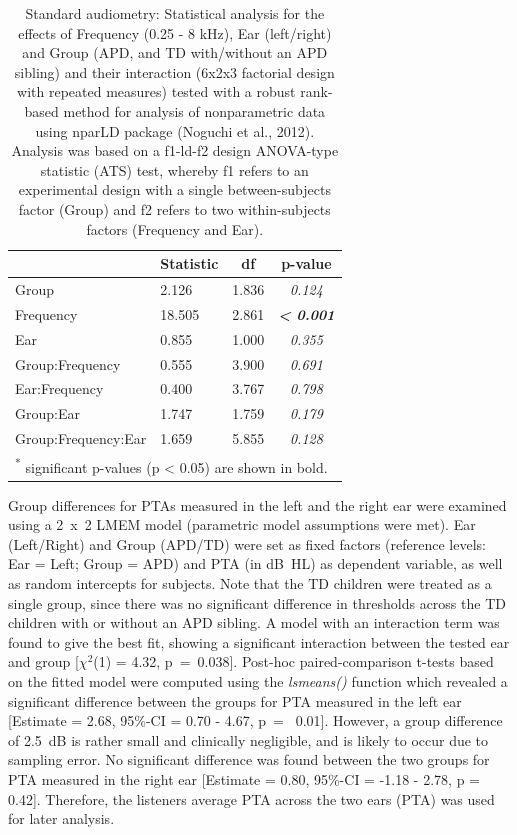 \documentclass[a4paper, twoside]{templates/ociamthesis}
\begin{document}
\begin{table}

\caption{\label{tab:RegAud-TabnparLD}Standard audiometry: Statistical analysis for the effects of Frequency (0.25 - 8 kHz), Ear (left/right) and Group (APD, and TD with/without an APD sibling) and their interaction (6x2x3 factorial design with repeated measures) tested with a robust rank-based method for analysis of nonparametric data using nparLD package (Noguchi et al., 2012). Analysis was based on a f1-ld-f2 design ANOVA-type statistic (ATS) test, whereby f1 refers to an experimental design with a single between-subjects factor (Group) and f2 refers to two within-subjects factors (Frequency and Ear).}
\centering
\begin{tabular}[t]{llc>{}c}
\toprule
  & Statistic & df & p-value\\
\midrule
Group & 2.126 & 1.836 & \em{0.124}\\
Frequency & 18.505 & 2.861 & \em{\textbf{< 0.001}}\\
Ear & 0.855 & 1.000 & \em{0.355}\\
Group:Frequency & 0.555 & 3.900 & \em{0.691}\\
Ear:Frequency & 0.400 & 3.767 & \em{0.798}\\
Group:Ear & 1.747 & 1.759 & \em{0.179}\\
Group:Frequency:Ear & 1.659 & 5.855 & \em{0.128}\\
\bottomrule
\multicolumn{4}{l}{\textsuperscript{*} significant p-values (p < 0.05) are shown in bold.}\\
\end{tabular}
\end{table}

Group differences for PTAs measured in the left and the right ear were examined using a 2~x~2 LMEM model (parametric model assumptions were met). Ear (Left/Right) and Group (APD/TD) were set as fixed factors (reference levels: Ear = Left; Group = APD) and PTA (in dB~HL) as dependent variable, as well as random intercepts for subjects. Note that the TD children were treated as a single group, since there was no significant difference in thresholds across the TD children with or without an APD sibling. A model with an interaction term was found to give the best fit, showing a significant interaction between the tested ear and group {[}\(\chi^2\)(1) = 4.32, p~=~0.038{]}. Post-hoc paired-comparison t-tests based on the fitted model were computed using the \emph{lsmeans()} function \autocite[\emph{emmeans} package;][]{emmeansPackageR} which revealed a significant difference between the groups for PTA measured in the left ear {[}Estimate = 2.68, 95\%-CI = 0.70 - 4.67, p~= ~0.01{]}. However, a group difference of 2.5~dB is rather small and clinically negligible, and is likely to occur due to sampling error. No significant difference was found between the two groups for PTA measured in the right ear {[}Estimate = 0.80, 95\%-CI = -1.18 - 2.78, p = 0.42{]}. Therefore, the listeners average PTA across the two ears (PTA) was used for later analysis.\\
\end{document}
